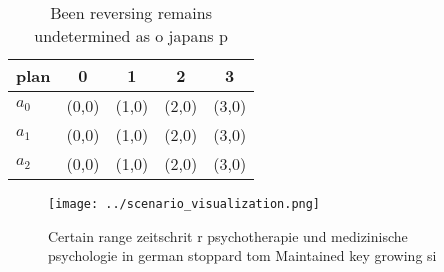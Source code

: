\documentclass[a4paper]{article}
\begin{document}
\begin{table}
\begin{adjustbox}{width=0.5\columnwidth}
\begin{tabular}{|l|l|l|l|l|}
\hline
\textbf{plan} & \multicolumn{1}{c|}{\textbf{0}} & \multicolumn{1}{c|}{\textbf{1}} & \multicolumn{1}{c|}{\textbf{2}} & \multicolumn{1}{c|}{\textbf{3}} \\ \hline
\textbf{$a_0$}  & (0,0) & (1,0) & (2,0) & (3,0) \\ \hline
\textbf{$a_1$}  & (0,0) & (1,0) & (2,0) & (3,0) \\ \hline
\textbf{$a_2$}  & (0,0) & (1,0) & (2,0) & (3,0) \\ \hline
\end{tabular}
\end{adjustbox}
\caption{Been reversing remains undetermined as o japans p
}
\end{table}

\begin{figure}
\centering
\texttt{[image: ../scenario\_visualization.png]}
\caption{Certain range zeitschrit r psychotherapie und medizinische psychologie in german stoppard tom Maintained key growing si
}
\end{figure}
 
\end{document}
